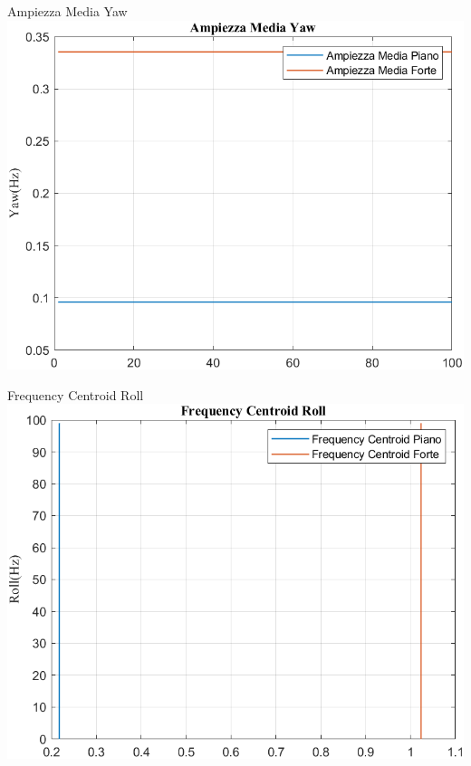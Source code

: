 	\begin{frame}{{Ampiezza Media Yaw}}
		\centering\includegraphics[height=.8\textheight]{figure/VAng/Trasformata/Ampiezza MediaYaw}
	\end{frame}
	
	\begin{frame}{{Frequency Centroid Roll}}
		\centering\includegraphics[height=.8\textheight]{figure/VAng/Trasformata/Frequency CentroidRoll}
	\end{frame}
	
